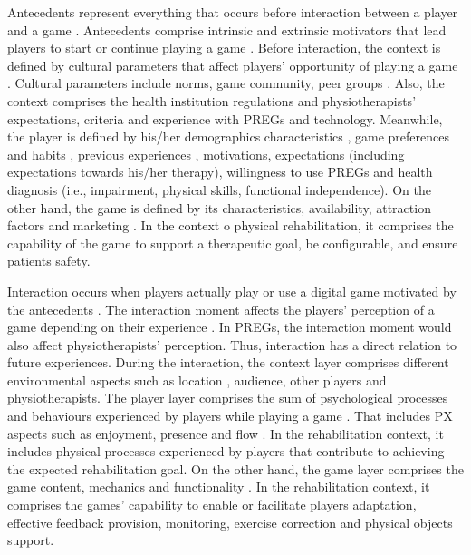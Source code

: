 Antecedents represent everything that occurs before interaction between a player and a game \autocite{Fernandez2008}. Antecedents comprise intrinsic and extrinsic motivators that lead players to start or continue playing a game \autocite{Fernandez2008}. Before interaction, the context is defined by cultural parameters that affect players' opportunity of playing a game \autocite{Elson2014,Nacked}. Cultural parameters include norms, game community, peer groups \autocite{Elson2014,Nacked}. Also, the context comprises the health institution regulations and physiotherapists' expectations, criteria and experience with \acp{PREG} and technology. Meanwhile, the player is defined by his/her demographics characteristics \autocite{Elson2014,Fernandez2008}, game preferences and habits \autocite{Fernandez2008}, previous experiences \autocite{Nacked,Elson2014}, motivations, expectations (including expectations towards his/her therapy), willingness to use \acp{PREG} and health diagnosis (i.e., impairment, physical skills, functional independence). On the other hand, the game is defined by its characteristics, availability, attraction factors and marketing \autocite{Elson2014,Nacked}. In the context o physical rehabilitation, it comprises the capability of the game to support a therapeutic goal, be configurable, and ensure patients safety.

Interaction occurs when players actually play or use a digital \autocite{Elson2014,Fernandez2008,Nacked} game motivated by the antecedents \autocite{Fernandez2008}. The interaction moment affects the players' perception of a game depending on their experience \autocite{Fernandez2008}. In \acp{PREG}, the interaction moment would also affect physiotherapists' perception. Thus, interaction has a direct relation to future experiences. During the interaction, the context layer comprises different environmental aspects such as location \autocite{Elson2014,Engl2013}, audience, other players \autocite{Elson2014,DeKort2007b,Mayra} and physiotherapists. The player layer comprises the sum of psychological processes and behaviours experienced by players while playing a game \autocite{Elson2014}. That includes \ac{PX} aspects such as enjoyment, presence and flow \autocite{Elson2014}. In the rehabilitation context, it includes physical processes experienced by players that contribute to achieving the expected rehabilitation goal. On the other hand, the game layer comprises the game content, mechanics and functionality \autocite{Elson2014,Engl2013,Nackea2}. In the rehabilitation context, it comprises the games' capability to enable or facilitate players adaptation, effective feedback provision, monitoring, exercise correction and physical objects support.

